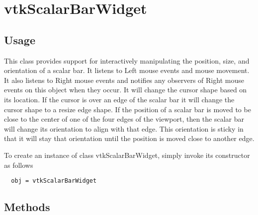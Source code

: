 \section{vtkScalarBarWidget}

\subsection{Usage}

 This class provides support for interactively manipulating the position,
 size, and orientation of a scalar bar. It listens to Left mouse events and
 mouse movement. It also listens to Right mouse events and notifies any 
 observers of Right mouse events on this object when they occur.
 It will change the cursor shape based on its location. If
 the cursor is over an edge of the scalar bar it will change the cursor
 shape to a resize edge shape. If the position of a scalar bar is moved to
 be close to the center of one of the four edges of the viewport, then the
 scalar bar will change its orientation to align with that edge. This
 orientation is sticky in that it will stay that orientation until the
 position is moved close to another edge.

To create an instance of class vtkScalarBarWidget, simply
invoke its constructor as follows
\begin{verbatim}
  obj = vtkScalarBarWidget
\end{verbatim}
\subsection{Methods}

